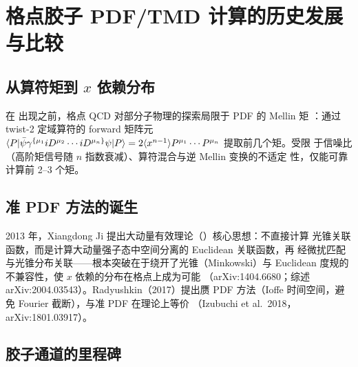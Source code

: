 \documentclass[11pt,a4paper]{ctexart}
\newcommand{\LaMET}{\text{LaMET}}
\begin{document}
\section{格点胶子 PDF/TMD 计算的历史发展与比较}
\label{sec:history}

\subsection{从算符矩到 $x$ 依赖分布}

在 \LaMET{} 出现之前，格点 QCD 对部分子物理的探索局限于 PDF 的 Mellin 矩
：通过 twist-2 定域算符的 forward 矩阵元
$\braket{P|\bar\psi\gamma^{\{\mu_1}iD^{\mu_2}\cdots iD^{\mu_n\}}\psi|P}
=2\langle x^{n-1}\rangle P^{\mu_1}\cdots P^{\mu_n}$ 提取前几个矩。受限
于信噪比（高阶矩信号随 $n$ 指数衰减）、算符混合与逆 Mellin 变换的不适定
性，仅能可靠计算前 2--3 个矩。

\subsection{准 PDF 方法的诞生}

2013 年，Xiangdong Ji 提出大动量有效理论（\LaMET）核心思想：不直接计算
光锥关联函数，而是计算大动量强子态中空间分离的 Euclidean 关联函数，再
经微扰匹配与光锥分布关联——根本突破在于绕开了光锥（Minkowski）与
Euclidean 度规的不兼容性，使 $x$ 依赖的分布在格点上成为可能
（arXiv:1404.6680；综述 arXiv:2004.03543）。Radyushkin（2017）提出赝
PDF 方法（Ioffe 时间空间，避免 Fourier 截断），与准 PDF 在理论上等价
（Izubuchi et al.\ 2018，arXiv:1801.03917）。

\subsection{胶子通道的里程碑}
\end{document}
